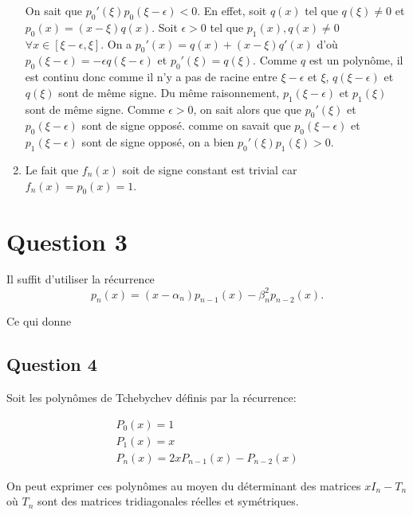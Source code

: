 \documentclass{article}
\begin{document}
\begin{enumerate}
    On sait que $p_0'(\xi)p_0(\xi - \epsilon) < 0$.
    En effet, soit $q(x)$ tel que $q(\xi) \neq 0$ et
    $p_0(x) = (x - \xi) q(x)$.
    Soit $\epsilon > 0$ tel que
    $p_1(x), q(x) \neq 0$ $\forall x \in [\xi - \epsilon, \xi]$.
    On a $p_0'(x) = q(x) + (x - \xi) q'(x)$ d'où
    $p_0(\xi - \epsilon) = -\epsilon q(\xi - \epsilon)$ et
    $p_0'(\xi) = q(\xi)$.
    Comme $q$ est un polynôme, il est continu donc comme il n'y a pas
    de racine entre $\xi - \epsilon$ et $\xi$, $q(\xi - \epsilon)$ et $q(\xi)$
    sont de même signe.
    Du même raisonnement, $p_1(\xi - \epsilon)$ et $p_1(\xi)$ sont
    de même signe.
    Comme $\epsilon > 0$, on sait alors que que
    $p_0'(\xi)$ et $p_0(\xi - \epsilon)$ sont de signe opposé.
    comme on savait que $p_0(\xi - \epsilon)$ et $p_1(\xi - \epsilon)$ sont
    de signe opposé, on a bien $p_0'(\xi) p_1(\xi) > 0$.
  \item Le fait que $f_n(x)$ soit de signe constant est trivial car
    $f_n(x) = p_0(x) = 1$.
\end{enumerate}

\section*{Question 3}
Il suffit d'utiliser la récurrence
\[ p_n(x) = (x - \alpha_n)p_{n-1}(x) - \beta_n^2 p_{n-2}(x). \]

Ce qui donne



\subsection{Question 4}
Soit les polynômes de Tchebychev définis par la récurrence: 

\begin{eqnarray}
P_0(x)=1\\
P_1(x)=x\\
P_n(x)=2xP_{n-1}(x)-P_{n-2}(x)
\end{eqnarray}

On peut exprimer ces polynômes au moyen du déterminant des matrices $xI_n - T_n$ où $T_n$ sont des matrices tridiagonales réelles et symétriques.
\end{document}
